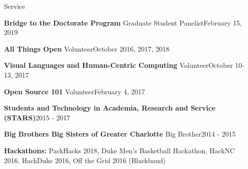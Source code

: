 \documentclass{resume} %
\begin{document}
\begin{rSection}{Service}
\vspace{-4pt}

\begin{sSubsection}
    {\textbf{Bridge to the Doctorate Program} Graduate Student Panelist}{February 15, 2019}
\end{sSubsection}
\vspace{-7pt}

\begin{sSubsection}
    {\textbf{All Things Open} Volunteer}{October 2016, 2017, 2018}
\end{sSubsection}
\vspace{-7pt}

\begin{sSubsection}
    {\textbf{Visual Languages and Human-Centric Computing} Volunteer}{October 10-13, 2017}
\end{sSubsection}
\vspace{-7pt}

\begin{sSubsection}
    {\textbf{Open Source 101} Volunteer}{February 4, 2017}
\end{sSubsection}
\vspace{-7pt}

\begin{sSubsection}
    {\textbf{Students and Technology in Academia, Research and Service (STARS)}}{2015 - 2017}
\end{sSubsection}
\vspace{-7pt}

\begin{sSubsection}
    {\textbf{Big Brothers Big Sisters of Greater Charlotte} Big Brother}{2014 - 2015}
\end{sSubsection}
\vspace{-7pt}
\begin{sSubsection}
    {\textbf{Hackathons:} PackHacks 2018, Duke Men's Basketball Hackathon, HackNC 2016, HackDuke 2016, Off the Grid 2016 (Blackbaud)}{}
\end{sSubsection}
\end{rSection}
\vspace{-12pt}
\end{document}
